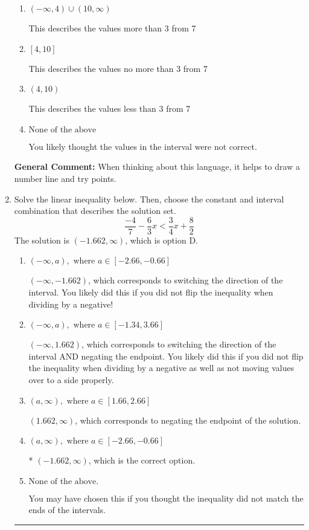 \documentclass{extbook}[14pt]
\newcommand{\litem}[1]{\item #1

\rule{\textwidth}{0.4pt}}
\begin{document}
\begin{enumerate}
{\begin{enumerate}[label=\Alph*.]
This describes the values no less than 3 from 7
\item \( (-\infty, 4) \cup (10, \infty) \)

This describes the values more than 3 from 7
\item \( [4, 10] \)

This describes the values no more than 3 from 7
\item \( (4, 10) \)

This describes the values less than 3 from 7
\item \( \text{None of the above} \)

You likely thought the values in the interval were not correct.
\end{enumerate}

\textbf{General Comment:} When thinking about this language, it helps to draw a number line and try points.
}
\litem{
Solve the linear inequality below. Then, choose the constant and interval combination that describes the solution set.
\[ \frac{-4}{7} - \frac{6}{3} x < \frac{3}{4} x + \frac{8}{2} \]
The solution is \( (-1.662, \infty) \), which is option D.\begin{enumerate}[label=\Alph*.]
\item \( (-\infty, a), \text{ where } a \in [-2.66, -0.66] \)

 $(-\infty, -1.662)$, which corresponds to switching the direction of the interval. You likely did this if you did not flip the inequality when dividing by a negative!
\item \( (-\infty, a), \text{ where } a \in [-1.34, 3.66] \)

 $(-\infty, 1.662)$, which corresponds to switching the direction of the interval AND negating the endpoint. You likely did this if you did not flip the inequality when dividing by a negative as well as not moving values over to a side properly.
\item \( (a, \infty), \text{ where } a \in [1.66, 2.66] \)

 $(1.662, \infty)$, which corresponds to negating the endpoint of the solution.
\item \( (a, \infty), \text{ where } a \in [-2.66, -0.66] \)

* $(-1.662, \infty)$, which is the correct option.
\item \( \text{None of the above}. \)

You may have chosen this if you thought the inequality did not match the ends of the intervals.
\end{enumerate}

}
\end{enumerate}
\end{document}
